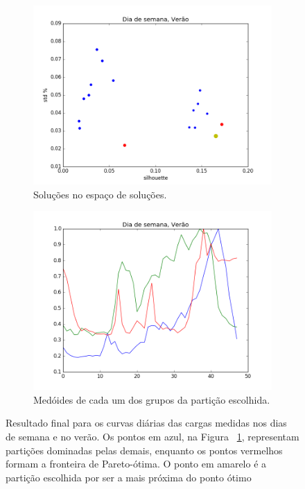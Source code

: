 \begin{figure}
	\centering
	\begin{subfigure}{.5\textwidth}
		\centering
		\includegraphics[width=.9\linewidth]{figuras/australia_5000/pareto_Dia_de_semana_Verao.png}
		\caption{Soluções no espaço de soluções.}
		\label{fig:pareto_DDS_verao}
	\end{subfigure}%
	\begin{subfigure}{.5\textwidth}
		\centering
		\includegraphics[width=.9\linewidth]{figuras/australia_5000/Dia_de_semana_Verao.png}
		\caption{Medóides de cada um dos grupos da partição escolhida.}
		\label{fig:DDS_verao}
	\end{subfigure}
	\caption{Resultado final para os curvas diárias das cargas medidas nos dias de semana e no verão. Os pontos em azul, na Figura ~\ref{fig:pareto_DDS_verao}, representam partições dominadas pelas demais, enquanto os pontos vermelhos formam a fronteira de Pareto-ótima. O ponto em amarelo é a partição escolhida por ser a mais próxima do ponto ótimo}
	\label{fig:DDS_verao_}
\end{figure}

